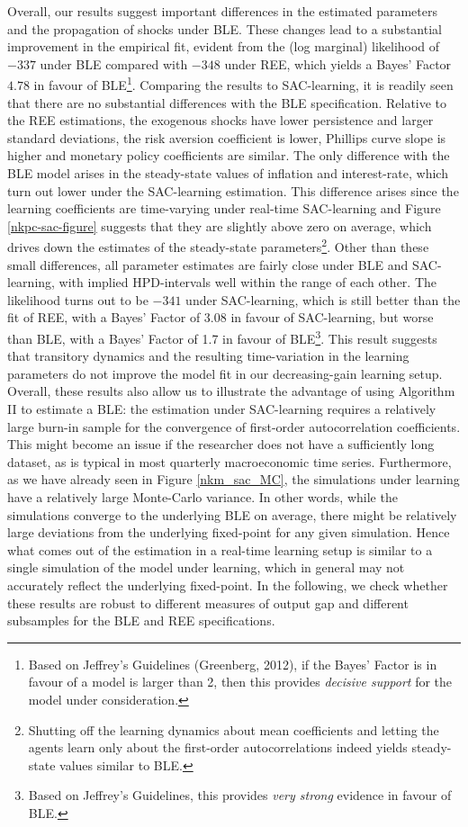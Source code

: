Overall, our results suggest important differences in the estimated parameters and the propagation of shocks under BLE. These changes lead to a substantial improvement in the empirical fit, evident from the (log marginal) likelihood of $-337$ under BLE compared with $-348$ under REE, which yields a Bayes' Factor $4.78$ in favour of BLE\footnote{Based on Jeffrey's Guidelines (Greenberg, 2012), if the Bayes' Factor is in favour of a model is larger than 2, then this provides \textit{decisive support} for the model under consideration.}. Comparing the results to SAC-learning, it is readily seen that there are no substantial differences with the BLE specification. Relative to the REE estimations, the exogenous shocks have lower persistence and larger standard deviations, the risk aversion coefficient is lower, Phillips curve slope is higher and monetary policy coefficients are similar. The only difference with the BLE model arises in the steady-state values of inflation and interest-rate, which turn out lower under the SAC-learning estimation. This difference arises since the learning coefficients are time-varying under real-time SAC-learning and Figure \ref{nkpc-sac-figure} suggests that they are slightly above zero on average, which drives down the estimates of the steady-state parameters\footnote{Shutting off the learning dynamics about mean coefficients and letting the agents learn only about the first-order autocorrelations indeed yields steady-state values similar to BLE.}. Other than these small differences, all parameter estimates are fairly close under BLE and SAC-learning, with implied HPD-intervals well within the range of each other. The likelihood turns out to be $-341$ under SAC-learning, which is still better than the fit of REE, with a Bayes' Factor of 3.08 in favour of SAC-learning, but worse than BLE, with a Bayes' Factor of 1.7 in favour of BLE\footnote{Based on Jeffrey's Guidelines, this provides \textit{very strong} evidence in favour of BLE.}. This result suggests that transitory dynamics and the resulting time-variation in the learning parameters do not improve the model fit in our decreasing-gain learning setup. Overall, these results also allow us to illustrate the advantage of using Algorithm II to estimate a BLE: the estimation under SAC-learning requires a relatively large burn-in sample for the convergence of first-order autocorrelation coefficients. This might become an issue if the researcher does not have a sufficiently long dataset, as is typical in most quarterly macroeconomic time series. Furthermore, as we have already seen in Figure \ref{nkm_sac_MC}, the simulations under learning have a relatively large Monte-Carlo variance. In other words, while the simulations converge to the underlying BLE on average, there might be relatively large deviations from the underlying fixed-point for any given simulation. Hence what comes out of the estimation in a real-time learning setup is similar to a single simulation of the model under learning, which in general may not accurately reflect the underlying fixed-point. In the following, we check whether these results are robust to different measures of output gap and different subsamples for the BLE and REE specifications.


